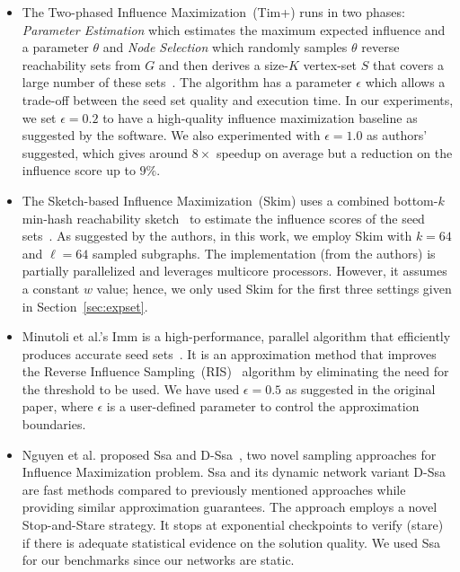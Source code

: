 \begin{itemize} [leftmargin=0.3cm]
\item The Two-phased Influence Maximization~({\sc Tim+}) runs in two phases: {\em Parameter Estimation} which estimates the maximum expected influence and a parameter $\theta$ and {\em Node Selection} which randomly samples $\theta$ reverse reachability sets from $G$ and then derives a size-$K$ vertex-set $S$ that covers a large number of these sets~\cite{tim}. The algorithm has a parameter $\epsilon$ which allows a trade-off between the seed set quality and execution time. In our experiments, we set  $\epsilon=0.2$ to have a high-quality influence maximization baseline as suggested by the software. We also experimented with $\epsilon = 1.0$ as authors' suggested, which gives around $8\times$ speedup on average but a reduction on the influence score up to $9\%$.

\item The Sketch-based Influence Maximization~({\sc Skim}) uses a combined bottom-$k$ min-hash reachability sketch~\cite{bottomk} to estimate the influence scores of the seed sets~\cite{cohen2014sketch}. As suggested by the authors, in this work, we employ {\sc Skim} with $k = 64$ and $\ell = 64$ sampled subgraphs. The implementation (from the authors) is partially parallelized and leverages multicore processors. However, it  assumes a constant $w$ value; hence, we only used {\sc Skim} for the first three settings given in Section~\ref{sec:expset}.

\item Minutoli et al.'s {\sc Imm} is a high-performance, parallel algorithm that efficiently produces accurate seed sets~\cite{minutoli2019fast}. 
It is an approximation method that improves the Reverse Influence Sampling~(RIS)~\cite{borgs2014maximizing} algorithm by eliminating the need for the threshold to be used. %
We have used $\epsilon = 0.5$ as suggested in the original paper, where $\epsilon$ is a user-defined parameter to control the approximation boundaries.

\item Nguyen et al. proposed {\sc Ssa} and {\sc D-Ssa}~\cite{nguyen2016stop}, two novel sampling approaches for Influence Maximization problem. {\sc Ssa} and its dynamic network variant {\sc D-Ssa} are fast methods compared to previously mentioned approaches while providing similar approximation guarantees. The approach employs a novel Stop-and-Stare strategy. It stops at exponential checkpoints to verify (stare) if there is adequate statistical evidence on the solution quality. We used {\sc Ssa} for our benchmarks since our networks are static. 


\end{itemize}
